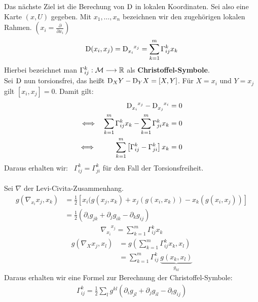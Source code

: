 Das nächste Ziel ist die Berechung von $\mathrm{D}$ in lokalen Koordinaten. Sei also eine Karte $(x, U)$ gegeben. Mit $x_1, \dots, x_n$ bezeichnen wir den zugehörigen lokalen Rahmen. $(x_i = \frac{\partial}{\partial x_i})$
\begin{align}
\mathrm{D}(x_i, x_j)= \mathrm{D}_{x_i}^{\phantom{x_i}x_j} = \sum_{k=1}^{m} \Gamma^k_{ij} x_k
\end{align}
Hierbei bezeichnet man $\Gamma^k_{ij}: \mathcal{M} \longrightarrow \mathbb{R}$ als \textbf{Christoffel-Symbole}. \\
Sei $\mathrm{D}$ nun torsionsfrei, das heißt $\mathrm{D}_XY - \mathrm{D}_YX = [X, Y]$.
Für $X=x_i$ und $Y=x_j$ gilt $[x_i, x_j]=0$. Damit gilt: 
\begin{align*}
\mathrm{D}_{x_i}^{\phantom{x_i} x_j} - \mathrm{D}_{x_j}^{\phantom{x_j}x_i} &= 0 \\
\Longleftrightarrow \quad \sum_{k=1}^{m}\Gamma^k_{ij} x_k - \sum_{k=1}^{m}\Gamma^k_{ji} x_k &= 0\\
\Longleftrightarrow \hspace{1cm} \sum_{k=1}^{m}\left[\Gamma^k_{ij} - \Gamma^k_{ji} \right] x_k &= 0
\end{align*}
Daraus erhalten wir: \ $\Gamma^k_{ij} = \Gamma^k_{ji}$ für den Fall der Torsionsfreiheit. \\
\phantom{.}\\
Sei $\nabla$ der Levi-Civita-Zusammenhang.
\begin{align*}
g(\nabla_{x_i}x_j, x_k) &= \frac{1}{2}\left[x_i(g(x_j, x_k)+ x_j(g(x_i, x_k)) - x_k(g(x_i, x_j)) \right] \\
								 &=  \frac{1}{2}(\partial_i g_{jk} + \partial_j g_{ik} - \partial_k g_{ij})
\end{align*}
\begin{align}
\nabla_{x_i}^{\phantom{x_i}x_j} = \sum_{k=1}^{m}\Gamma_{ij}^k x_k
\end{align}
\begin{align*}
g(\nabla_Xx_j, x_l) &= g\left(\sum_{k=1}^{m}\Gamma_{ij}^k x_k, x_l\right) \\
							&= \sum_{k=1}^{m}\Gamma_{ij}^k \ \underbrace{g(x_k, x_l)}_{g_{kl}}							
\end{align*}
Daraus erhalten wir eine Formel zur Berechnung der Christoffel-Symbole:
\begin{align}
\Gamma_{ij}^k = \frac{1}{2} \sum_{l}g^{kl}\left(\partial_i g_{jl} + \partial_j g_{il} - \partial_l g_{ij}\right)
\end{align}

